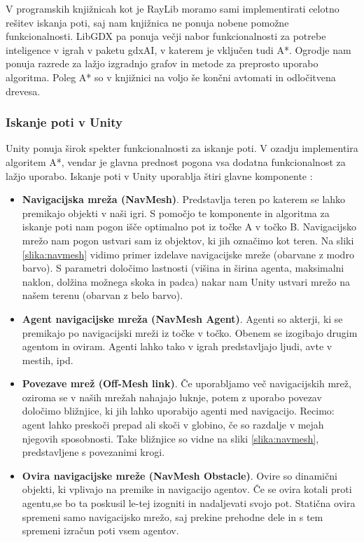 \documentclass[12pt,a4paper,twoside]{book}
\begin{document}
V programskih knjižnicah kot je RayLib moramo sami implementirati celotno rešitev iskanja poti, saj nam knjižnica ne ponuja nobene pomožne funkcionalnosti. LibGDX pa ponuja večji nabor funkcionalnosti za potrebe inteligence v igrah v paketu gdxAI, v katerem je vključen tudi A*. Ogrodje nam ponuja razrede za lažjo izgradnjo grafov in metode za preprosto uporabo algoritma. Poleg A* so v knjižnici na voljo še končni avtomati in odločitvena drevesa.

\subsubsection{Iskanje poti v Unity}

Unity ponuja širok spekter funkcionalnosti za iskanje poti. V ozadju implementira algoritem A*, vendar je glavna prednost pogona vsa dodatna funkcionalnost za lažjo uporabo. Iskanje poti v Unity uporablja štiri glavne komponente \cite{navmesh}:
\begin{itemize}
	\item \textbf{Navigacijska mreža (NavMesh)}. Predstavlja teren po katerem se lahko premikajo objekti v naši igri. S pomočjo te komponente in algoritma za iskanje poti nam pogon išče optimalno pot iz točke A v točko B. Navigacijsko mrežo nam pogon ustvari sam iz objektov, ki jih označimo kot teren. Na sliki \ref{slika:navmesh} vidimo primer izdelave navigacijske mreže (obarvane z modro barvo). S parametri določimo lastnosti (višina in širina agenta, maksimalni naklon, dolžina možnega skoka in padca) nakar nam Unity ustvari mrežo na našem terenu (obarvan z belo barvo).
	\item \textbf{Agent navigacijske mreža (NavMesh Agent)}. Agenti so akterji, ki se premikajo po navigacijski mreži iz točke v točko. Obenem se izogibajo drugim agentom in oviram. Agenti lahko tako v igrah predstavljajo ljudi, avte v mestih, ipd.
	\item \textbf{Povezave mrež (Off-Mesh link)}. Če uporabljamo več navigacijskih mrež, oziroma se v naših mrežah nahajajo luknje, potem z uporabo povezav določimo bližnjice, ki jih lahko uporabijo agenti med navigacijo. Recimo: agent lahko preskoči prepad ali skoči v globino, če so razdalje v mejah njegovih sposobnosti. Take bližnjice so vidne na sliki \ref{slika:navmesh}, predstavljene s povezanimi krogi.
	\item \textbf{Ovira navigacijske mreže (NavMesh Obstacle)}. Ovire so dinamični objekti, ki vplivajo na premike in navigacijo agentov. Če se ovira kotali proti agentu,se bo ta poskusil le-tej izogniti in nadaljevati svojo pot. Statična ovira spremeni samo navigacijsko mrežo, saj prekine prehodne dele in s tem spremeni izračun poti vsem agentov. 
\end{itemize}
\end{document}
